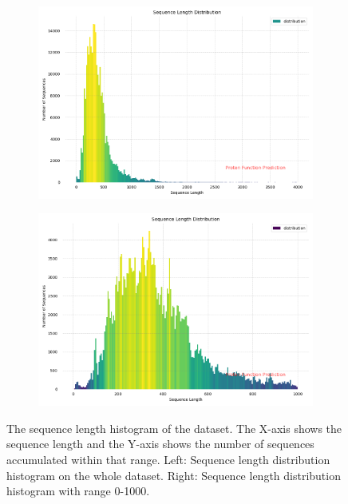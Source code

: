\documentclass[conference]{IEEEtran}
\begin{document}
\begin{figure}[htp!]
  \centering
  \begin{subfigure}[b]{1\linewidth}
      \centering
    \includegraphics[width=1\linewidth]{images/Sequence_SizeDistribution(2000).png}
    \caption{}
    \label{fig:subfig1}
  \end{subfigure}
  \vspace{0.5cm} %
  \begin{subfigure}[b]{1\linewidth}
      \centering
    \includegraphics[width=1\linewidth]{images/Sequence_SizeDistribution(1000).png}
    \caption{}
    \label{fig:subfig2}
  \end{subfigure}
  \caption{The sequence length histogram of the dataset. The X-axis shows the sequence length and the Y-axis shows the number of sequences accumulated within that range. Left: Sequence length distribution histogram on the whole dataset. Right: Sequence length distribution histogram with range 0-1000.}
  \label{fig:Sequence_SizeDistribution}
\end{figure}
\end{document}
